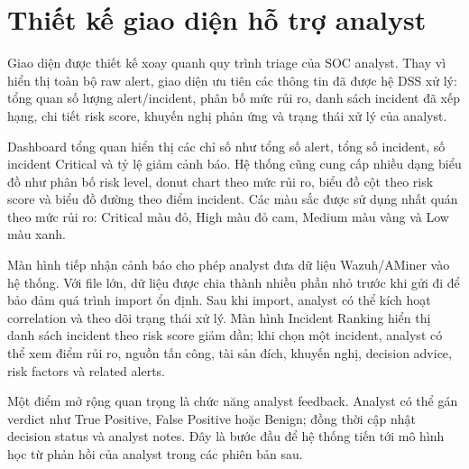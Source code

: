\documentclass[a4paper,12pt,oneside]{book}
\begin{document}
\section{Thiết kế giao diện hỗ trợ analyst}
{\fontsize{13pt}{15.6pt}\selectfont

Giao diện được thiết kế xoay quanh quy trình triage của SOC analyst. Thay vì hiển thị toàn bộ raw alert, giao diện ưu tiên các thông tin đã được hệ DSS xử lý: tổng quan số lượng alert/incident, phân bố mức rủi ro, danh sách incident đã xếp hạng, chi tiết risk score, khuyến nghị phản ứng và trạng thái xử lý của analyst.

\noindent Dashboard tổng quan hiển thị các chỉ số như tổng số alert, tổng số incident, số incident Critical và tỷ lệ giảm cảnh báo. Hệ thống cũng cung cấp nhiều dạng biểu đồ như phân bố risk level, donut chart theo mức rủi ro, biểu đồ cột theo risk score và biểu đồ đường theo điểm incident. Các màu sắc được sử dụng nhất quán theo mức rủi ro: Critical màu đỏ, High màu đỏ cam, Medium màu vàng và Low màu xanh.

\noindent Màn hình tiếp nhận cảnh báo cho phép analyst đưa dữ liệu Wazuh/AMiner vào hệ thống. Với file lớn, dữ liệu được chia thành nhiều phần nhỏ trước khi gửi đi để bảo đảm quá trình import ổn định. Sau khi import, analyst có thể kích hoạt correlation và theo dõi trạng thái xử lý. Màn hình Incident Ranking hiển thị danh sách incident theo risk score giảm dần; khi chọn một incident, analyst có thể xem điểm rủi ro, nguồn tấn công, tài sản đích, khuyến nghị, decision advice, risk factors và related alerts.

\noindent Một điểm mở rộng quan trọng là chức năng analyst feedback. Analyst có thể gán verdict như True Positive, False Positive hoặc Benign; đồng thời cập nhật decision status và analyst notes. Đây là bước đầu để hệ thống tiến tới mô hình học từ phản hồi của analyst trong các phiên bản sau.

}
\end{document}

